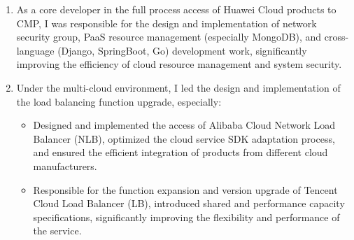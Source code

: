 \documentclass{resume}
\newcommand{\en}[1]{#1}
\newcommand{\zh}[1]{}
\begin{document}
\begin{itemize}
\begin{enumerate}
                        \zh{独自负责了「公有云测试流程」的开发，完善了ksboot新项目从零到一的搭建，包括不限于符合现代软件工程的设计规范、统一异常处理及RESTful风格返回。
                              此外，确保了新系统与nacos/星环的兼容性；并顺利实现了与旧云集平台的流程调用集成；定时任务切换为公司的任务调度平台；
                              权限采用前后端结合来控制，提高了系统安全性，并完善了测试流程对账相关的功能，基于用户反馈，我持续修复缺陷并升级系统功能，显著提升了测试流程的效率和系统的可维护性。
                              通过全面管理公有云测试资源，我实现了流程控制、逾期提醒及资源开通等功能，极大地简化了不同角色用户（如普通用户和SRE）对资源的操作和管理，提升了平台的使用便利性和效率。}
                  \item \en{As a core developer in the full process access of Huawei Cloud products to CMP, I was responsible for the design and implementation of network security group, PaaS resource management (especially MongoDB), and cross-language (Django, SpringBoot, Go) development work, significantly improving the efficiency of cloud resource management and system security.}
                        \zh{在华为云产品全流程接入CMP中担任核心开发者，负责设计与实施网络安全组、PaaS资源管理（特别是MongoDB）以及跨语言（Django、SpringBoot、Go）开发工作，显著提高了云资源的管理效率和系统安全性。}
                  \item \en{Under the multi-cloud environment, I led the design and implementation of the load balancing function upgrade, especially:}
                        \zh{在多云环境下，主导了负载均衡功能升级的设计与实现，特别是：}
                        \begin{itemize}
                              \item \en{Designed and implemented the access of Alibaba Cloud Network Load Balancer (NLB), optimized the cloud service SDK adaptation process, and ensured the efficient integration of products from different cloud manufacturers.}
                                    \zh{设计并实现了阿里云网络型负载均衡NLB的接入，优化了云服务SDK的适配流程，确保了不同云厂商产品的高效整合。}
                              \item \en{Responsible for the function expansion and version upgrade of Tencent Cloud Load Balancer (LB), introduced shared and performance capacity specifications, significantly improving the flexibility and performance of the service.}
                                    \zh{负责腾讯云负载均衡LB的功能扩展与版本升级，引入共享型和性能容量型规格，显著提升了服务的灵活性和性能。}
                        \end{itemize}

\end{enumerate}
\end{itemize}
\end{document}
